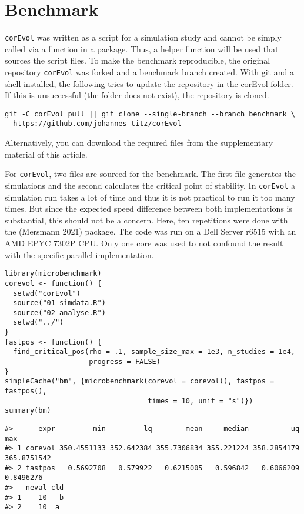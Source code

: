 \hypertarget{benchmark}{%
\section{Benchmark}\label{benchmark}}

\texttt{corEvol} was written as a script for a simulation study and cannot be simply called via a function in a package. Thus, a helper function will be used that sources the script files. To make the benchmark reproducible, the original repository \texttt{corEvol} was forked and a benchmark branch created. With git and a shell installed, the following tries to update the repository in the corEvol folder. If this is unsuccessful (the folder does not exist), the repository is cloned.

\begin{verbatim}
git -C corEvol pull || git clone --single-branch --branch benchmark \
  https://github.com/johannes-titz/corEvol
\end{verbatim}

Alternatively, you can download the required files from the supplementary material of this article.

For \texttt{corEvol}, two files are sourced for the benchmark. The first file generates the simulations and the second calculates the critical point of stability. In \texttt{corEvol} a simulation run takes a lot of time and thus it is not practical to run it too many times. But since the expected speed difference between both implementations is substantial, this should not be a concern. Here, ten repetitions were done with the  (Mersmann 2021) package. The code was run on a Dell Server r6515 with an AMD EPYC 7302P CPU. Only one core was used to not confound the result with the specific parallel implementation.

\begin{verbatim}
library(microbenchmark)
corevol <- function() {
  setwd("corEvol")
  source("01-simdata.R")
  source("02-analyse.R")
  setwd("../")
}
fastpos <- function() {
  find_critical_pos(rho = .1, sample_size_max = 1e3, n_studies = 1e4,
                    progress = FALSE)
}
simpleCache("bm", {microbenchmark(corevol = corevol(), fastpos = fastpos(),
                                  times = 10, unit = "s")})
summary(bm)
\end{verbatim}

\begin{verbatim}
#>      expr         min         lq        mean     median          uq         max
#> 1 corevol 350.4551133 352.642384 355.7306834 355.221224 358.2854179 365.8751542
#> 2 fastpos   0.5692708   0.579922   0.6215005   0.596842   0.6066209   0.8496276
#>   neval cld
#> 1    10   b
#> 2    10  a
\end{verbatim}

